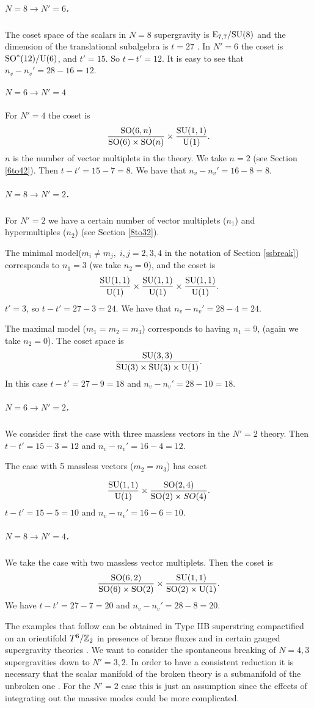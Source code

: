 \documentclass[a4paper,12pt]{article}
\begin{document}
\subparagraph{$N=8\rightarrow N'=6$.} The coset space of the
scalars in  $N=8$ supergravity is $\mathrm{E}_{7,7}/\mathrm{SU}(8)$ and the
dimension of the translational subalgebra is $t=27$ \cite{adfft}.
In $N'=6$ the coset is $\mathrm{SO}^*(12)/\mathrm{U}(6)$, and $t'=15$. So
$t-t'=12$. It is easy to see that $n_v-n_v'=28-16=12$.

\subparagraph {$N=6\rightarrow N'=4$} For $N'=4$ the coset is
$$\frac{\mathrm{SO}(6,n)}{\mathrm{SO}(6)\times\mathrm{SO}(n)}\times
\frac{\mathrm{SU}(1,1)}{\mathrm{U}(1)}. $$$n$ is the number of vector multiplets
in the theory. We take $n=2$ (see Section \ref{6to42}). Then
$t-t'=15-7=8$. We have  that  $n_v-n_v'=16-8=8$.

\subparagraph{$N=8\rightarrow N'=2$.} For $N'=2$ we  have a
certain number of vector multiplets  ($n_1$) and hypermultiples
($n_2$) (see Section \ref{8to32}).

The minimal model($m_i\neq m_j,\; i,j= 2,3,4$ in the notation of
Section \ref{ssbreak}) corresponds to  $n_1=3$ (we take $n_2=0$),
and  the coset is
$$\frac{\mathrm{SU}(1,1)}{\mathrm{U}(1)}\times\frac{\mathrm{SU}(1,1)}{\mathrm{U}(1)}\times\frac{\mathrm{SU}(1,1)}{\mathrm{U}(1)}.
$$$t'=3$, so $t-t'=27-3=24$. We have that  $n_v-n_v'=28-4=24$.

The maximal model ($m_1= m_2=m_3$) corresponds to having $n_1=9$, (again we take $n_2=0$). The coset space is
$$\frac{\mathrm{SU}(3,3)}{\mathrm{SU}(3)\times\mathrm{SU}(3)\times\mathrm{U}(1)}.$$ In this case $t-t'=27-9=18$ and $n_v-n_v'=28-10=18$.

\subparagraph{$N=6\rightarrow N'=2$.} We consider  first the case
with three massless vectors in the $N'=2$ theory. Then
$t-t'=15-3=12$ and $n_v-n_v'=16-4=12$.

The case with 5 massless vectors ($m_2=m_3$) has coset

$$\frac{\mathrm{SU}(1,1)}{\mathrm{U}(1)}\times\frac{\mathrm{SO}(2,4)}{\mathrm{SO}(2)\times SO(4)}.$$
$t-t'=15-5=10$ and $n_v-n_v'=16-6=10$.

\subparagraph{$N=8\rightarrow N'=4$.} We take the case with two massless vector multiplets. Then the coset is
$$\frac{\mathrm{SO}(6,2)}{\mathrm{SO}(6)\times \mathrm{SO}(2)}\times\frac{\mathrm{SU}(1,1)}{\mathrm{SO}(2)\times \mathrm{U}(1)}.$$
We have $t-t'=27-7=20$ and $n_v-n_v'=28-8=20$.


\bigskip

The examples that follow can be obtained  in Type IIB superstring
 compactified on an orientifold $T^6/\mathbb{Z}_2$ in presence of brane fluxes  \cite{fp,kst} and in certain
  gauged supergravity theories \cite{tz}.
We  want to consider the spontaneous breaking of $N=4,3$
supergravities down to $N'=3,2$. In order to have a consistent
reduction it is necessary that  the scalar manifold of
 the broken theory is a submanifold of the unbroken one \cite{adf}. For the $N'=2$ case this is just
 an assumption since the effects of integrating out the massive modes could be more complicated.
\end{document}
